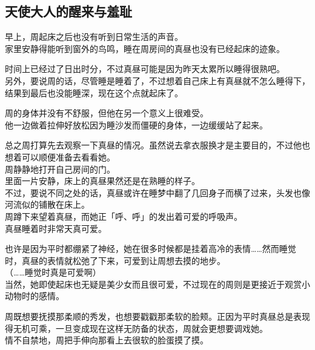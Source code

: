 
\subsection{天使大人的醒来与羞耻}

早上，周起床之后也没有听到日常生活的声音。\\

家里安静得能听到窗外的鸟鸣，睡在周房间的真昼也没有已经起床的迹象。

时间上已经过了日出时分，不过真昼可能是因为昨天太累所以睡得很熟吧。\\

另外，要说周的话，尽管睡是睡着了，不过想着自己床上有真昼就不怎么睡得下，结果到最后也没能睡深，现在这个点就起床了。

周的身体并没有不舒服，但他在另一个意义上很难受。\\

他一边做着拉伸好放松因为睡沙发而僵硬的身体，一边缓缓站了起来。

总之周打算先去观察一下真昼的情况。虽然说去拿衣服换才是主要目的，不过他也想着可以顺便准备去看看她。\\

周静静地打开自己房间的门。\\

里面一片安静，床上的真昼果然还是在熟睡的样子。\\

不过，要说不同之处的话，真昼或许在睡梦中翻了几回身子而横了过来，头发也像河流似的铺散在床上。\\

周蹲下来望着真昼，而她正「呼、呼」的发出着可爱的呼吸声。\\

真昼睡着时非常天真可爱。

也许是因为平时都绷紧了神经，她在很多时候都是挂着高冷的表情……然而睡觉时，真昼的表情就松弛了下来，可爱到让周想去摸的地步。\\

（……睡觉时真是可爱啊）\\

当然，她即使起床也无疑是美少女而且很可爱，不过现在的周则是更接近于观赏小动物时的感情。

周既想要抚摸那柔顺的秀发，也想要戳戳那柔软的脸颊。正因为平时真昼总是表现得无机可乘，一旦变成现在这样无防备的状态，周就会更想要调戏她。\\

情不自禁地，周把手伸向那看上去很软的脸蛋摸了摸。\\

